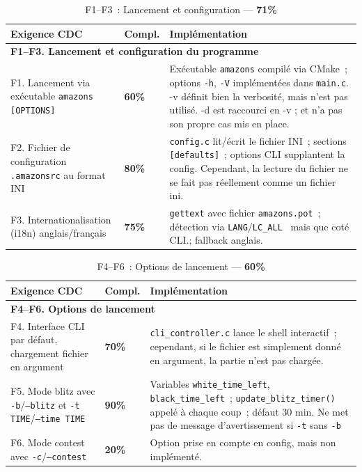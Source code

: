 \documentclass[a4paper]{article}
\begin{document}
\begin{table}[H]
\centering
\renewcommand{\arraystretch}{1.4}
\begin{tabular}{|p{6cm}|p{1.5cm}|p{8cm}|}
\hline
\textbf{Exigence CDC} & \textbf{Compl.} & \textbf{Implémentation} \\
\hline
\multicolumn{3}{|l|}{\textbf{F1--F3. Lancement et configuration du programme}} \\
\hline
F1. Lancement via exécutable \texttt{amazons [OPTIONS]}
& \textbf{60\%}
& Exécutable \texttt{amazons} compilé via CMake~; options \texttt{-h}, \texttt{-V} implémentées dans \texttt{main.c}. -v définit bien la verbosité, mais n'est pas utilisé. -d est raccourci en -v ; et n'a pas son propre cas mis en place. \\
\hline
F2. Fichier de configuration \texttt{.amazonsrc} au format INI
& \textbf{80\%}
& \texttt{config.c} lit/écrit le fichier INI~; sections \texttt{[defaults]}~; options CLI supplantent la config. Cependant, la lecture du fichier ne se fait pas réellement comme un fichier ini. \\
\hline
F3. Internationalisation (i18n) anglais/français
& \textbf{75\%}
& \texttt{gettext} avec fichier \texttt{amazons.pot}~; détection via \texttt{LANG}/\texttt{LC\_ALL}~ mais que coté CLI.; fallback anglais. \\
\hline
\end{tabular}
\caption{F1--F3~: Lancement et configuration --- \textbf{71\%}}
\label{tab:f1-f3}
\end{table}
 
 
\begin{table}[H]
\centering
\renewcommand{\arraystretch}{1.4}
\begin{tabular}{|p{6cm}|p{1.5cm}|p{8cm}|}
\hline
\textbf{Exigence CDC} & \textbf{Compl.} & \textbf{Implémentation} \\
\hline
\multicolumn{3}{|l|}{\textbf{F4--F6. Options de lancement}} \\
\hline
F4. Interface CLI par défaut, chargement fichier en argument
& \textbf{70\%}
& \texttt{cli\_controller.c} lance le shell interactif~; cependant, si le fichier est simplement donné en argument, la partie n'est pas chargée. \\
\hline
F5. Mode blitz avec \texttt{-b}/\texttt{--blitz} et \texttt{-t TIME}/\texttt{--time TIME}
& \textbf{90\%}
& Variables \texttt{white\_time\_left}, \texttt{black\_time\_left}~; \texttt{update\_blitz\_timer()} appelé à chaque coup~; défaut 30 min. Ne met pas de message d'avertissement si \texttt{-t} sans \texttt{-b} \\
\hline
F6. Mode contest avec \texttt{-c}/\texttt{--contest}
& \textbf{20\%}
& Option prise en compte en config, mais non implémenté. \\
\hline
\end{tabular}
\caption{F4--F6~: Options de lancement --- \textbf{60\%}}
\label{tab:f4-f6}
\end{table}
 
\end{document}
